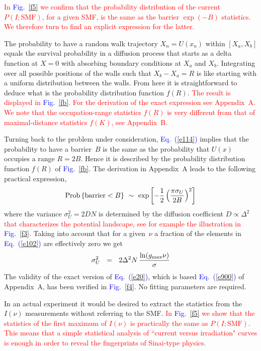 \documentclass[aps,pre,floats,floatfix,twocolumn]{revtex4}
\newcommand{\mylabel}[1]{\label{#1}}
\newcommand{\eeq}{\end{eqnarray}}
\newcommand{\be}[1]{\begin{eqnarray}\ifthenelse{#1=-1}
{\nonumber}{\ifthenelse{#1=0}{}{\mylabel{e#1}}}}
\newcommand{\Eq}[1]{\textcolor{blue}{Eq.\!\!~(\ref{#1})}}
\newcommand{\Fig}[1]{\textcolor{blue}{Fig.}\!\!~\ref{#1}}
\newcommand{\rmrk}[1]{\textcolor{red}{#1}}
\begin{document}
\rmrk{In \Fig{f5} we confirm that the probability 
distribution of the current $P(I;\text{SMF})$, for a given SMF,  
is the same as the barrier ${\exp(-B)}$ statistics. 
We therefore turn to find an explicit expression for the latter.} 


The probability to have a random walk trajectory $X_n=U(x_n)$ within $[X_a,X_b]$ 
equals the survival probability in a diffusion process  
that starts as a delta function at ${X=0}$ 
with absorbing boundary conditions at $X_a$ and $X_b$.   
Integrating over all possible positions of the walls 
such that ${X_b-X_a=R}$ is like starting with a 
uniform distribution between the walls. From here 
it is straightforward to deduce what is the probability 
distribution function $f(R)$. 
%
\rmrk{ The result is displayed in \Fig{fb}.
For the derivation of the exact expression see Appendix~A. 
We note that the occupation-range statistics $f(R)$ is very different 
from that of maximal-distance statistics $f(K)$, see Appendix~B.} 

Turning back to the problem under consideration, \Eq{e114} implies 
that the probability to have a barrier~$B$ is the same as the 
probability that $U(x)$ occupies a range ${R=2B}$. 
Hence it is described by the probability distribution 
function $f(R)$ of \Fig{fb}. The derivation in Appendix~A 
leads to the following practical expression,  
%
\be{20}
\text{Prob}\left\{\text{barrier}<B\right\} \ \sim \ \exp\left[-\frac{1}{2} \left(\frac{\pi \sigma_U}{2B}\right)^2\right] 
\eeq
%
where the variance $\sigma_U^2 = 2D N$ is determined 
by the diffusion coefficient $D\propto \Delta^2$ 
\rmrk{that characterizes the potential landscape, 
see for example the illustration in \Fig{f3}.}   
Taking into account that for a given~$\nu$ a fraction of the elements
in \Eq{e102} are effectively zero we get 
%
\be{211}
\sigma_U^2 \ \ = \ \ 2 \Delta^2 N  \, \frac{\ln(g_{\text{max}}\nu)}{\sigma}
\eeq  
%  
The validity of the exact version of \Eq{e20}, 
which is based \Eq{e900} of Appendix~A, 
has been verified in \Fig{f4}. 
No fitting parameters are required. 


In an actual experiment it would be desired to 
extract the statistics from the $I(\nu)$ measurements 
without referring to the SMF. \rmrk{In \Fig{f5} we 
show that the statistics of the first maximum 
of $I(\nu)$ is practically the same as $P(I;\text{SMF})$.
This means that a simple statistical analysis of 
``current versus irradiation" curves is enough in order    
to reveal the fingerprints of Sinai-type physics.} 
\end{document}
